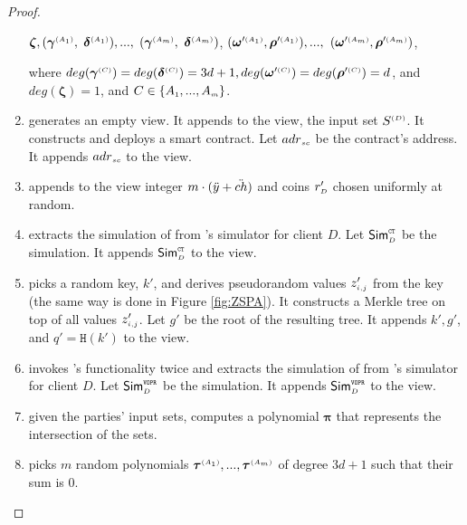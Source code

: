 \begin{proof}
\begin{enumerate}
 $ {\bm\zeta}, ( {\bm\gamma}^{\scriptscriptstyle(A_1)},$ $  {\bm\delta}^{\scriptscriptstyle (A_1)}),...,$ $ ( {\bm\gamma}^{\scriptscriptstyle(A_m)}, $ $ {\bm\delta}^{\scriptscriptstyle (A_m)})$,  $( {\bm\omega}'^{\scriptscriptstyle (A_1)},  {\bm\rho}'^{\scriptscriptstyle (A_1)}),..., $ $( {\bm\omega}'^{\scriptscriptstyle (A_m)},  {\bm\rho}'^{\scriptscriptstyle (A_m)})$,
 
  where $deg( {\bm\gamma}^{\scriptscriptstyle(C)})=deg( {\bm\delta}^{\scriptscriptstyle(C)})=3d+1,  deg( {\bm\omega}'^{\scriptscriptstyle (C)}) = deg( {\bm\rho}'^{\scriptscriptstyle (C)})= d$, and $deg( {\bm\zeta})=1$, and $C\in  \{  {  A}_{ \scriptscriptstyle {   1}}, ...,   {  A}_{ \scriptscriptstyle {   m}}\} $.
%
\item generates an empty view. It appends to the view, the input set $S^{\scriptscriptstyle (D)}$. It constructs and deploys a smart contract. Let $  {adr}_{\scriptscriptstyle sc}$ be the contract's address. It appends $ {adr}_{\scriptscriptstyle sc}$ to the view. 


\item appends to the view integer $m\cdot(\ddot{y}+\ddot{ch})$   and coins $r'_{\scriptscriptstyle D}$ chosen uniformly at random. 
%
\item extracts the simulation of \ct from \ct's simulator for client $D$. Let $\mathsf{Sim}^{\scriptscriptstyle \mathtt{CT}}_{\scriptscriptstyle D}$ be the simulation. It appends $\mathsf{Sim}^{\scriptscriptstyle \mathtt{CT}}_{\scriptscriptstyle D}$ to the view. 
%
\item picks a random key, $  k'$, and derives pseudorandom values $z'_{\scriptscriptstyle i,j}$ from the key (the same way is done in Figure \ref{fig:ZSPA}). It constructs a Merkle tree on top of all values $z'_{\scriptscriptstyle i, j}$. Let $g'$ be the root of the resulting tree. It appends $  k', g'$, and $q'=\mathtt{H}(  k')$ to the view. 
%
\item invokes \vopr's functionality twice and extracts the simulation of \vopr from \vopr's simulator for client $D$. Let $\mathsf{Sim}^{\scriptscriptstyle \mathtt{VOPR}}_{\scriptscriptstyle D}$ be the simulation. It appends $\mathsf{Sim}^{\scriptscriptstyle \mathtt{VOPR}}_{\scriptscriptstyle D}$ to the view.  
%
\item given the parties' input sets, computes a polynomial $ {\bm\pi}$ that represents the intersection of the sets. 

\item picks $m$ random polynomials $ {\bm\tau}^{\scriptscriptstyle (A_1)}, ...,  {\bm\tau}^{\scriptscriptstyle (A_m)}$ of degree $3d+1$ such that their sum is $0$.  



\end{enumerate}
\end{proof}
